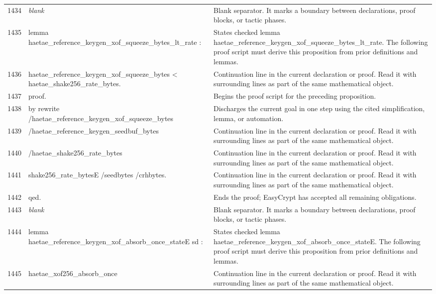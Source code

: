 \documentclass[10pt]{article}
\begin{document}
\begin{longtable}{r L{0.53\textwidth} L{0.37\textwidth}}
1434 & {\ttfamily\scriptsize \emph{blank}} & Blank separator.  It marks a boundary between declarations, proof blocks, or tactic phases. \\
1435 & {\ttfamily\scriptsize lemma haetae\_reference\_keygen\_xof\_squeeze\_bytes\_lt\_rate :} & States checked lemma haetae\_reference\_keygen\_xof\_squeeze\_bytes\_lt\_rate.  The following proof script must derive this proposition from prior definitions and lemmas. \\
1436 & {\ttfamily\scriptsize   haetae\_reference\_keygen\_xof\_squeeze\_bytes < haetae\_shake256\_rate\_bytes.} & Continuation line in the current declaration or proof.  Read it with surrounding lines as part of the same mathematical object. \\
1437 & {\ttfamily\scriptsize proof.} & Begins the proof script for the preceding proposition. \\
1438 & {\ttfamily\scriptsize by rewrite /haetae\_reference\_keygen\_xof\_squeeze\_bytes} & Discharges the current goal in one step using the cited simplification, lemma, or automation. \\
1439 & {\ttfamily\scriptsize            /haetae\_reference\_keygen\_seedbuf\_bytes} & Continuation line in the current declaration or proof.  Read it with surrounding lines as part of the same mathematical object. \\
1440 & {\ttfamily\scriptsize            /haetae\_shake256\_rate\_bytes} & Continuation line in the current declaration or proof.  Read it with surrounding lines as part of the same mathematical object. \\
1441 & {\ttfamily\scriptsize            shake256\_rate\_bytesE /seedbytes /crhbytes.} & Continuation line in the current declaration or proof.  Read it with surrounding lines as part of the same mathematical object. \\
1442 & {\ttfamily\scriptsize qed.} & Ends the proof; EasyCrypt has accepted all remaining obligations. \\
1443 & {\ttfamily\scriptsize \emph{blank}} & Blank separator.  It marks a boundary between declarations, proof blocks, or tactic phases. \\
1444 & {\ttfamily\scriptsize lemma haetae\_reference\_keygen\_xof\_absorb\_once\_stateE sd :} & States checked lemma haetae\_reference\_keygen\_xof\_absorb\_once\_stateE.  The following proof script must derive this proposition from prior definitions and lemmas. \\
1445 & {\ttfamily\scriptsize   haetae\_xof256\_absorb\_once} & Continuation line in the current declaration or proof.  Read it with surrounding lines as part of the same mathematical object. \\

\end{longtable}
\end{document}
